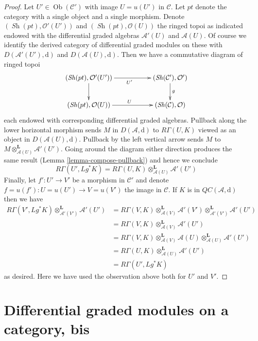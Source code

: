 \documentclass{stacks-project}
\theoremstyle{plain}
\theoremstyle{definition}
\theoremstyle{remark}
\numberwithin{equation}{subsection}
\def\Ob{\mathop{\mathrm{Ob}}\nolimits}
\def\Sh{\mathop{\mathit{Sh}}\nolimits}
\begin{document}
\begin{proof}
Let $U' \in \Ob(\mathcal{C}')$ with image $U = u(U')$ in $\mathcal{C}$.
Let $pt$ denote the category with a single object and a single morphism.
Denote $(\Sh(pt), \mathcal{O}'(U'))$ and $(\Sh(pt), \mathcal{O}(U))$
the ringed topoi as indicated endowed with the differential graded
algebras $\mathcal{A}'(U)$ and $\mathcal{A}(U)$.
Of course we identify the derived category of differential graded modules
on these with $D(\mathcal{A}'(U'), \text{d})$ and
$D(\mathcal{A}(U), \text{d})$.
Then we have a commutative diagram of ringed topoi
$$
\xymatrix{
(\Sh(pt), \mathcal{O}'(U')) \ar[rr]_{U'} \ar[d] & &
(\Sh(\mathcal{C}'), \mathcal{O}') \ar[d]^g \\
(\Sh(pt), \mathcal{O}(U)) \ar[rr]^U & &
(\Sh(\mathcal{C}), \mathcal{O})
}
$$
each endowed with corresponding differential graded algebras.
Pullback along the lower horizontal morphism sends $M$ in
$D(\mathcal{A}, \text{d})$ to $R\Gamma(U, K)$ viewed as an
object in $D(\mathcal{A}(U), \text{d})$.
Pullback by the left vertical arrow sends $M$ to
$M \otimes_{\mathcal{A}(U)}^\mathbf{L} \mathcal{A}'(U')$.
Going around the diagram either direction produces the same result
(Lemma \ref{lemma-compose-pullback}) and hence we conclude
$$
R\Gamma(U', Lg^*K) =
R\Gamma(U, K) \otimes_{\mathcal{A}(U)}^\mathbf{L} \mathcal{A}'(U')
$$
Finally, let $f' : U' \to V'$ be a morphism in $\mathcal{C}'$ and
denote $f = u(f') : U = u(U') \to V = u(V')$ the image in $\mathcal{C}$.
If $K$ is in $\mathit{QC}(\mathcal{A}, \text{d})$ then we have
\begin{align*}
R\Gamma(V', Lg^*K) \otimes_{\mathcal{A}'(V')}^\mathbf{L} \mathcal{A}'(U')
& =
R\Gamma(V, K) \otimes_{\mathcal{A}(V)}^\mathbf{L} \mathcal{A}'(V')
\otimes_{\mathcal{A}'(V')}^\mathbf{L} \mathcal{A}'(U') \\
& =
R\Gamma(V, K) \otimes_{\mathcal{A}(V)}^\mathbf{L} \mathcal{A}'(U') \\
& =
R\Gamma(V, K) \otimes_{\mathcal{A}(V)}^\mathbf{L} \mathcal{A}(U)
\otimes_{\mathcal{A}(U)}^\mathbf{L} \mathcal{A}'(U') \\
& =
R\Gamma(U, K) \otimes_{\mathcal{A}(U)}^\mathbf{L} \mathcal{A}'(U') \\
& =
R\Gamma(U', Lg^*K)
\end{align*}
as desired. Here we have used the observation above both for $U'$ and $V'$.
\end{proof}






\section{Differential graded modules on a category, bis}
\label{section-modules-cohomology-bis}
\end{document}
